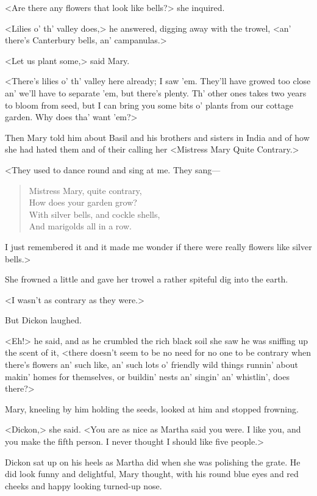 <Are there any flowers that look like bells?> she inquired.

<Lilies o' th' valley does,> he answered, digging away with the trowel, <an' there's Canterbury bells, an' campanulas.>

<Let us plant some,> said Mary.

<There's lilies o' th' valley here already; I saw 'em. They'll have growed too close an' we'll have to separate 'em, but there's plenty. Th' other ones takes two years to bloom from seed, but I can bring you some bits o' plants from our cottage garden. Why does tha' want 'em?>

Then Mary told him about Basil and his brothers and sisters in India and of how she had hated them and of their calling her <Mistress Mary Quite Contrary.>

<They used to dance round and sing at me. They sang—

\begin{verse}
Mistress Mary, quite contrary,\\
How does your garden grow?\\
With silver bells, and cockle shells,\\
And marigolds all in a row.
\end{verse}

\noindent I just remembered it and it made me wonder if there were really flowers like silver bells.>

She frowned a little and gave her trowel a rather spiteful dig into the earth.

<I wasn't as contrary as they were.>

But Dickon laughed.

<Eh!> he said, and as he crumbled the rich black soil she saw he was sniffing up the scent of it, <there doesn't seem to be no need for no one to be contrary when there's flowers an' such like, an' such lots o' friendly wild things runnin' about makin' homes for themselves, or buildin' nests an' singin' an' whistlin', does there?>

Mary, kneeling by him holding the seeds, looked at him and stopped frowning.

<Dickon,> she said. <You are as nice as Martha said you were. I like you, and you make the fifth person. I never thought I should like five people.>

Dickon sat up on his heels as Martha did when she was polishing the grate. He did look funny and delightful, Mary thought, with his round blue eyes and red cheeks and happy looking turned-up nose.

